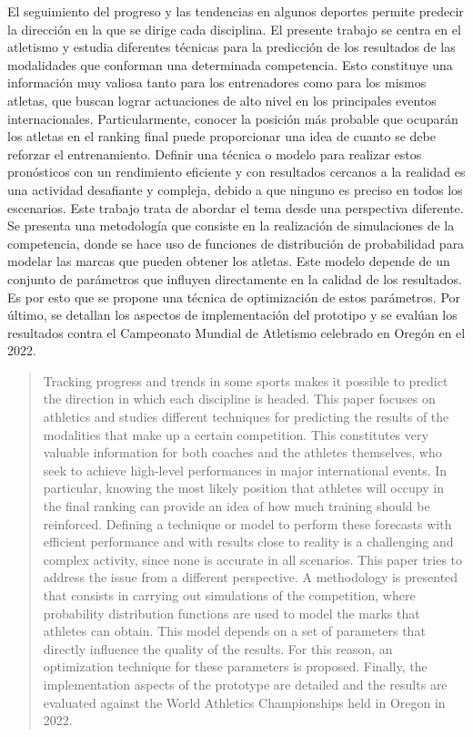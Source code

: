 \begin{resumen}

	El seguimiento del progreso y las tendencias en algunos deportes permite predecir la dirección en la que se dirige cada disciplina. El presente trabajo se centra en el atletismo y estudia diferentes técnicas para la predicción de los resultados de las modalidades que conforman una determinada competencia. Esto constituye una información muy valiosa tanto para los entrenadores como para los mismos atletas, que buscan lograr actuaciones de alto nivel en los principales eventos internacionales. Particularmente, conocer la posición más probable que ocuparán los atletas en el ranking final puede proporcionar una idea de cuanto se debe reforzar el entrenamiento. Definir una técnica o modelo para realizar estos pronósticos con un rendimiento eficiente y con resultados cercanos a la realidad es una actividad desafiante y compleja, debido a que ninguno es preciso en todos los escenarios. Este trabajo trata de abordar el tema desde una perspectiva diferente. Se presenta una metodología que consiste en la realización de simulaciones de la competencia, donde se hace uso de funciones de distribución de probabilidad para modelar las marcas que pueden obtener los atletas. Este modelo depende de un conjunto de parámetros que influyen directamente en la calidad de los resultados. Es por esto que se propone una técnica de optimización de estos parámetros. Por último, se detallan los aspectos de implementación del prototipo y se evalúan los resultados contra el Campeonato Mundial de Atletismo celebrado en Oregón en el 2022.
	
\end{resumen}

\begin{abstract}

	Tracking progress and trends in some sports makes it possible to predict the direction in which each discipline is headed. This paper focuses on athletics and studies different techniques for predicting the results of the modalities that make up a certain competition. This constitutes very valuable information for both coaches and the athletes themselves, who seek to achieve high-level performances in major international events. In particular, knowing the most likely position that athletes will occupy in the final ranking can provide an idea of how much training should be reinforced. Defining a technique or model to perform these forecasts with efficient performance and with results close to reality is a challenging and complex activity, since none is accurate in all scenarios. This paper tries to address the issue from a different perspective. A methodology is presented that consists in carrying out simulations of the competition, where probability distribution functions are used to model the marks that athletes can obtain. This model depends on a set of parameters that directly influence the quality of the results. For this reason, an optimization technique for these parameters is proposed. Finally, the implementation aspects of the prototype are detailed and the results are evaluated against the World Athletics Championships held in Oregon in 2022.

\end{abstract}
